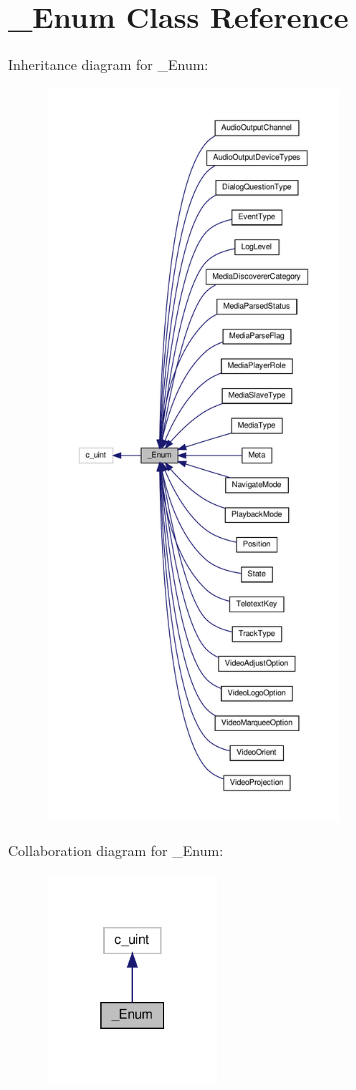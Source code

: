 \hypertarget{classvlc_1_1___enum}{}\section{\+\_\+\+Enum Class Reference}
\label{classvlc_1_1___enum}


Inheritance diagram for \+\_\+\+Enum\+:
\nopagebreak
\begin{figure}[H]
\begin{center}
\leavevmode
\includegraphics[height=550pt]{classvlc_1_1___enum__inherit__graph}
\end{center}
\end{figure}


Collaboration diagram for \+\_\+\+Enum\+:
\nopagebreak
\begin{figure}[H]
\begin{center}
\leavevmode
\includegraphics[width=127pt]{classvlc_1_1___enum__coll__graph}
\end{center}
\end{figure}
